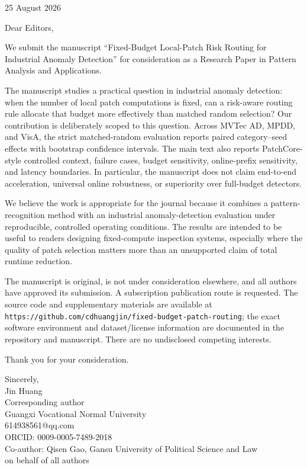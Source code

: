 \documentclass[11pt]{article}
\begin{document}
\onehalfspacing

\begin{flushright}
25 August 2026
\end{flushright}

Dear Editors,

We submit the manuscript ``Fixed-Budget Local-Patch Risk Routing for Industrial Anomaly Detection'' for consideration as a Research Paper in Pattern Analysis and Applications.

The manuscript studies a practical question in industrial anomaly detection: when the number of local patch computations is fixed, can a risk-aware routing rule allocate that budget more effectively than matched random selection? Our contribution is deliberately scoped to this question. Across MVTec AD, MPDD, and VisA, the strict matched-random evaluation reports paired category--seed effects with bootstrap confidence intervals. The main text also reports PatchCore-style controlled context, failure cases, budget sensitivity, online-prefix sensitivity, and latency boundaries. In particular, the manuscript does not claim end-to-end acceleration, universal online robustness, or superiority over full-budget detectors.

We believe the work is appropriate for the journal because it combines a pattern-recognition method with an industrial anomaly-detection evaluation under reproducible, controlled operating conditions. The results are intended to be useful to readers designing fixed-compute inspection systems, especially where the quality of patch selection matters more than an unsupported claim of total runtime reduction.

The manuscript is original, is not under consideration elsewhere, and all authors have approved its submission. A subscription publication route is requested. The source code and supplementary materials are available at \texttt{https://github.com/cdhuangjin/fixed-budget-patch-routing}; the exact software environment and dataset/license information are documented in the repository and manuscript. There are no undisclosed competing interests.

Thank you for your consideration.

Sincerely,\\[6pt]
Jin Huang\\
Corresponding author\\
Guangxi Vocational Normal University\\
614938561@qq.com\\
ORCID: 0009-0005-7489-2018\\
Co-author: Qisen Gao, Gansu University of Political Science and Law\\
on behalf of all authors
\end{document}
